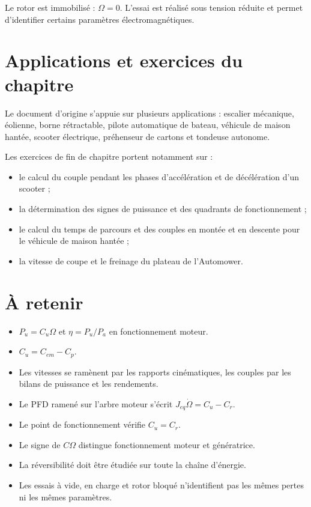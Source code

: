 Le rotor est immobilisé : $\Omega=0$. L'essai est réalisé sous tension réduite et permet d'identifier certains paramètres électromagnétiques.

\section{Applications et exercices du chapitre}\label{sec:em-applications}

Le document d'origine s'appuie sur plusieurs applications : escalier mécanique, éolienne, borne rétractable, pilote automatique de bateau, véhicule de maison hantée, scooter électrique, préhenseur de cartons et tondeuse autonome.

Les exercices de fin de chapitre portent notamment sur :
\begin{itemize}
  \item le calcul du couple pendant les phases d'accélération et de décélération d'un scooter ;
  \item la détermination des signes de puissance et des quadrants de fonctionnement ;
  \item le calcul du temps de parcours et des couples en montée et en descente pour le véhicule de maison hantée ;
  \item la vitesse de coupe et le freinage du plateau de l'Automower.
\end{itemize}

\section{À retenir}\label{sec:em-retenir}

\begin{itemize}
  \item $P_u=C_u\Omega$ et $\eta=P_u/P_a$ en fonctionnement moteur.
  \item $C_u=C_{em}-C_p$.
  \item Les vitesses se ramènent par les rapports cinématiques, les couples par les bilans de puissance et les rendements.
  \item Le PFD ramené sur l'arbre moteur s'écrit $J_{eq}\dot\Omega=C_u-C_r$.
  \item Le point de fonctionnement vérifie $C_u=C_r$.
  \item Le signe de $C\Omega$ distingue fonctionnement moteur et génératrice.
  \item La réversibilité doit être étudiée sur toute la chaîne d'énergie.
  \item Les essais à vide, en charge et rotor bloqué n'identifient pas les mêmes pertes ni les mêmes paramètres.
\end{itemize}
